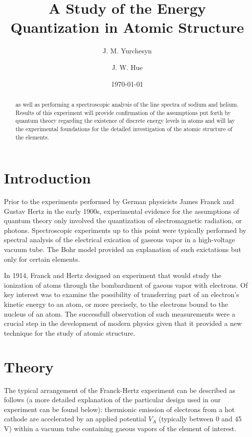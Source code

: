 \documentclass[aps,twocolumn,secnumarabic,balancelastpage,amsmath,amssymb,nofootinbib]{revtex4}
\begin{document}
\title{A Study of the Energy Quantization in Atomic Structure}
\author{J. M. Yurchesyn}
\author{J. W. Hue}
\date{\today}

\begin{abstract}
 as well as performing a spectroscopic analysis of the line spectra of sodium and helium.  Results of this experiment will provide confirmation of the assumptions put forth by quantum theory
 regarding the existence of discrete energy levels in atoms and will lay the experimental foundations for the detailed investigation of the atomic structure of the elements. 
\end{abstract}

\maketitle
\section{Introduction}

Prior to the experiments performed by German physicists James Franck and Gustav Hertz in the early 1900s, experimental evidence for the assumptions of quantum theory only involved the 
quantization of electromagnetic radiation, or photons.  Spectroscopic experiments up to this point were typically performed by spectral analysis of the electrical exication of gaseous vapor 
in a high-voltage vacuum tube.  The Bohr model provided an explanation of such exictations but only for certain elements.

In 1914, Franck and Hertz designed an experiment that would study the ionization of atoms through the bombardment of gaeous vapor with electrons.  Of key interest was to examine the possibility
of transferring part of an electron's kinetic energy to an atom, or more precisely, to the electrons bound to the nucleus of an atom.  The successfull observation of such measurements were a crucial
step in the development of modern physics given that it provided a new technique for the study of atomic structure.

\section{Theory}

The typical arrangement of the Franck-Hertz experiment can be described as follows (a more detailed explanation of the particular design used in our experiment can be found below): thermionic 
emission of electrons from a hot cathode are accelerated by an applied potential $V_{A}$ (typically between 0 and 45 V) within a vacuum tube containing gaeous vapors of the element of interest.  
\end{document}
